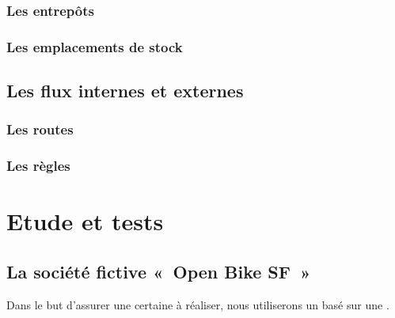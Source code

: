 \documentclass[letterpaper,10pt,french]{sphinxmanual}
\begin{document}
\subsection{Les entrepôts}
\label{\detokenize{readthedocs/fonctionnement:les-entrepots}}

\subsection{Les emplacements de stock}
\label{\detokenize{readthedocs/fonctionnement:les-emplacements-de-stock}}

\section{Les flux internes et externes}
\label{\detokenize{readthedocs/fonctionnement:les-flux-internes-et-externes}}\begin{quote}

\begin{figure}[htbp]
\centering

\noindent{}
\end{figure}

\end{quote}


\subsection{Les routes}
\label{\detokenize{readthedocs/fonctionnement:les-routes}}

\subsection{Les règles}
\label{\detokenize{readthedocs/fonctionnement:les-regles}}

\chapter{Etude et tests}
\label{\detokenize{readthedocs/study:etude-et-tests}}\label{\detokenize{readthedocs/study::doc}}

\section{La société fictive « Open Bike SF »}
\label{\detokenize{readthedocs/study:la-societe-fictive-open-bike-sf}}
Dans le but d’assurer une certaine  à réaliser, nous utiliserons un  basé sur une .
\end{document}
